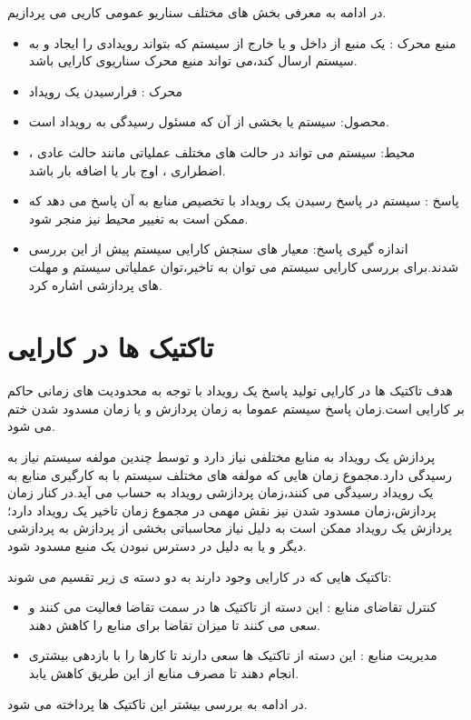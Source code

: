 در ادامه به معرفی بخش های مختلف سناریو عمومی کاریی می پردازیم.
\begin{itemize}
\item
منبع محرک :
یک منبع از داخل و یا خارج از سیستم که بتواند رویدادی را ایجاد و به سیستم ارسال کند،‌می تواند منبع محرک سناریوی کارایی باشد.
\item
محرک : 
فرارسیدن یک رویداد
\item
محصول: سیستم یا بخشی از آن که مسئول رسیدگی به رویداد است.
\item
محیط:
سیستم می تواند در حالت های مختلف عملیاتی مانند حالت عادی ، اضطراری ، اوج بار یا اضافه بار باشد.
\item
پاسخ :
سیستم در پاسخ رسیدن یک رویداد با تخصیص منابع به آن پاسخ می دهد که ممکن است به تغییر محیط نیز منجر شود.
\item
اندازه گیری پاسخ:
معیار های سنجش کارایی سیستم پیش از این بررسی شدند.برای بررسی کارایی سیستم می توان به تاخیر،‌توان عملیاتی سیستم و مهلت های پردازشی اشاره کرد.
\end{itemize}

\section{تاکتیک ها در کارایی}
هدف تاکتیک ها در کارایی تولید پاسخ یک رویداد با توجه به محدودیت های زمانی حاکم بر کارایی است.زمان پاسخ سیستم عموما به زمان پردازش و یا زمان مسدود شدن  ختم می شود.

پردازش یک رویداد به منابع مختلفی نیاز دارد و توسط چندین مولفه سیستم نیاز به رسیدگی دارد.مجموع زمان هایی که مولفه های مختلف سیستم با به کار‌گیری منابع به یک رویداد رسیدگی می کنند،‌زمان پردازشی رویداد به حساب می آید.در کنار زمان پردازش،زمان مسدود شدن نیز نقش مهمی در مجموع زمان تاخیر یک رویداد دارد؛پردازش یک رویداد ممکن است به دلیل نیاز محاسباتی بخشی از پردازش به پردازشی دیگر و یا به دلیل در دسترس نبودن یک منبع مسدود شود.

تاکتیک هایی که در کارایی وجود دارند به دو دسته ی زیر تقسیم می شوند:
\begin{itemize}
\item
کنترل تقاضای منابع : این دسته از تاکتیک ها در سمت تقاضا فعالیت می کنند و سعی می کنند تا میزان تقاضا برای منابع را کاهش دهند.
\item
مدیریت منابع : این دسته از تاکتیک ها سعی دارند تا کار‌ها را با بازدهی بیشتری انجام دهند تا مصرف منابع از این طریق کاهش یابد.
\end{itemize}
در ادامه به بررسی بیشتر این تاکتیک ها پرداخته می شود.
